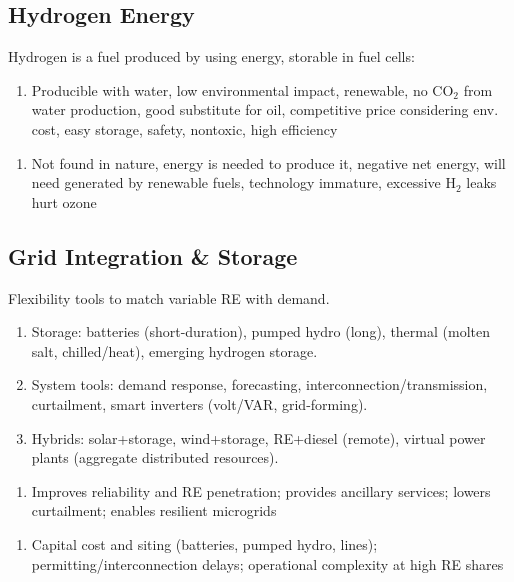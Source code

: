 \documentclass[12pt, a4paper]{article}
\begin{document}
\begin{multicols*}{3}
\subsection{Hydrogen Energy}
Hydrogen is a fuel produced by using energy, storable in fuel cells:
\begin{enumerate}[$+$]
  \item Producible with water, low environmental impact, renewable, no CO$_2$ from water production, good substitute for oil, competitive price considering env. cost, easy storage, safety, nontoxic, high efficiency 
\end{enumerate}\vspace{-1pt}
\begin{enumerate}[$-$]
  \item Not found in nature, energy is needed to produce it, negative net energy, will need generated by renewable fuels, technology immature, excessive H$_2$ leaks hurt ozone
\end{enumerate}

\colbreak
\subsection{Grid Integration \& Storage}
Flexibility tools to match variable RE with demand.
\begin{enumerate}[\roman*.]
  \item Storage: batteries (short-duration), pumped hydro (long), thermal (molten salt, chilled/heat), emerging hydrogen storage.
  \item System tools: demand response, forecasting, interconnection/transmission, curtailment, smart inverters (volt/VAR, grid-forming).
  \item Hybrids: solar+storage, wind+storage, RE+diesel (remote), virtual power plants (aggregate distributed resources).
\end{enumerate}\vspace{-1pt}
\begin{enumerate}[$+$]
  \item Improves reliability and RE penetration; provides ancillary services; lowers curtailment; enables resilient microgrids
\end{enumerate}\vspace{-1pt}
\begin{enumerate}[$-$]
  \item Capital cost and siting (batteries, pumped hydro, lines); permitting/interconnection delays; operational complexity at high RE shares
\end{enumerate}


\end{multicols*}
\end{document}
